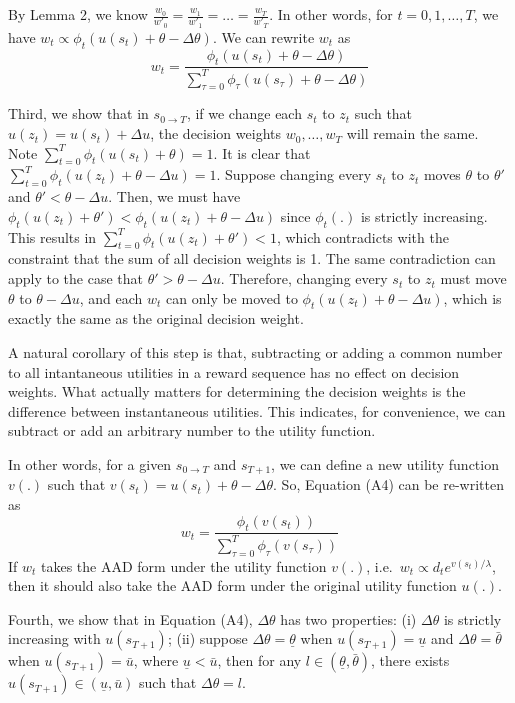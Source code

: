 \documentclass[
  12pt,
]{article}
\begin{document}
By Lemma 2, we know
\(\frac{w_0}{w'_0}=\frac{w_1}{w'_1}=…=\frac{w_T}{w'_T}\). In other
words, for \(t=0,1,…,T\), we have
\(w_t \propto \phi_t(u(s_t)+\theta-\Delta \theta)\). We can rewrite
\(w_t\) as \[\tag{A4}
w_t = \frac{\phi_t(u(s_t)+\theta-\Delta \theta)}{\sum_{\tau=0}^{T}\phi_\tau(u(s_\tau)+\theta-\Delta \theta)}
\]

Third, we show that in \(s_{0\rightarrow T}\), if we change each \(s_t\)
to \(z_t\) such that \(u(z_t)=u(s_t)+\Delta u\), the decision weights
\(w_0,…,w_T\) will remain the same. Note
\(\sum_{t=0}^T \phi_t(u(s_t)+\theta)=1\). It is clear that
\(\sum_{t=0}^T \phi_t(u(z_t)+\theta-\Delta u)=1\). Suppose changing
every \(s_t\) to \(z_t\) moves \(\theta\) to \(\theta'\) and
\(\theta'<\theta-\Delta u\). Then, we must have
\(\phi_t(u(z_t)+\theta')<\phi_t(u(z_t)+\theta-\Delta u)\) since
\(\phi_t(.)\) is strictly increasing. This results in
\(\sum_{t=0}^T \phi_t(u(z_t)+\theta')<1\), which contradicts with the
constraint that the sum of all decision weights is 1. The same
contradiction can apply to the case that \(\theta'>\theta-\Delta u\).
Therefore, changing every \(s_t\) to \(z_t\) must move \(\theta\) to
\(\theta - \Delta u\), and each \(w_t\) can only be moved to
\(\phi_t(u(z_t)+\theta -\Delta u)\), which is exactly the same as the
original decision weight.

A natural corollary of this step is that, subtracting or adding a common
number to all intantaneous utilities in a reward sequence has no effect
on decision weights. What actually matters for determining the decision
weights is the difference between instantaneous utilities. This
indicates, for convenience, we can subtract or add an arbitrary number
to the utility function.

In other words, for a given \(s_{0\rightarrow T}\) and \(s_{T+1}\), we
can define a new utility function \(v(.)\) such that
\(v(s_t) = u(s_t) +\theta-\Delta \theta\). So, Equation (A4) can be
re-written as\[\tag{A5}
w_t = \frac{\phi_t(v(s_t))}{\sum_{\tau=0}^{T}\phi_\tau(v(s_\tau))}
\]If \(w_t\) takes the AAD form under the utility function \(v(.)\),
i.e.~\(w_t \propto d_t e^{v(s_t)/\lambda}\), then it should also take
the AAD form under the original utility function \(u(.)\).

Fourth, we show that in Equation (A4), \(\Delta \theta\) has two
properties: (i) \(\Delta \theta\) is strictly increasing with
\(u(s_{T+1})\); (ii) suppose \(\Delta \theta = \underline{\theta}\) when
\(u(s_{T+1})=\underline{u}\) and \(\Delta\theta=\bar{\theta}\) when
\(u(s_{T+1})=\bar{u}\), where \(\underline{u}<\bar{u}\), then for any
\(l \in(\underline{\theta},\bar{\theta})\), there exists
\(u(s_{T+1})\in(\underline{u},\bar{u})\) such that
\(\Delta \theta = l\).
\end{document}
